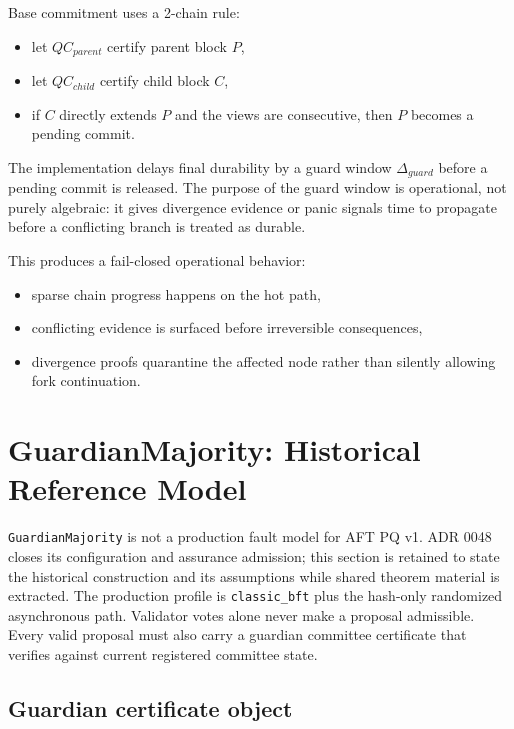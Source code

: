 \documentclass[11pt]{article}
\newcommand{\code}[1]{\texttt{#1}}
\begin{document}
Base commitment uses a 2-chain rule:

\begin{itemize}[leftmargin=1.5em]
\item let \(QC_{parent}\) certify parent block \(P\),
\item let \(QC_{child}\) certify child block \(C\),
\item if \(C\) directly extends \(P\) and the views are consecutive, then
\(P\) becomes a pending commit.
\end{itemize}

The implementation delays final durability by a guard window
\(\Delta_{guard}\) before a pending commit is released. The purpose of the
guard window is operational, not purely algebraic: it gives divergence
evidence or panic signals time to propagate before a conflicting branch is
treated as durable.

This produces a fail-closed operational behavior:

\begin{itemize}[leftmargin=1.5em]
\item sparse chain progress happens on the hot path,
\item conflicting evidence is surfaced before irreversible consequences,
\item divergence proofs quarantine the affected node rather than silently
allowing fork continuation.
\end{itemize}

\section{GuardianMajority: Historical Reference Model}

\code{GuardianMajority} is not a production fault model for AFT PQ v1. ADR
0048 closes its configuration and assurance admission; this section is
retained to state the historical construction and its assumptions while
shared theorem material is extracted. The production profile is
\code{classic\_bft} plus the hash-only randomized asynchronous path.
Validator votes alone never make a proposal admissible. Every valid proposal
must also carry a guardian committee certificate that verifies against current
registered committee state.

\subsection{Guardian certificate object}
\end{document}
